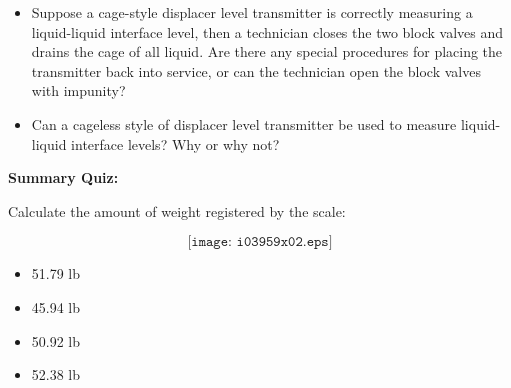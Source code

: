 \begin{itemize}
\item{} Suppose a cage-style displacer level transmitter is correctly measuring a liquid-liquid interface level, then a technician closes the two block valves and drains the cage of all liquid.  Are there any special procedures for placing the transmitter back into service, or can the technician open the block valves with impunity?
\item{} Can a cageless style of displacer level transmitter be used to measure liquid-liquid interface levels?  Why or why not?
\end{itemize}












\vfil \eject

\noindent
{\bf Summary Quiz:}

Calculate the amount of weight registered by the scale:

$$\texttt{[image: i03959x02.eps]}$$

\begin{itemize}
\item{} 51.79 lb
\vskip 5pt 
\item{} 45.94 lb
\vskip 5pt 
\item{} 50.92 lb
\vskip 5pt 
\item{} 52.38 lb 
\end{itemize}















